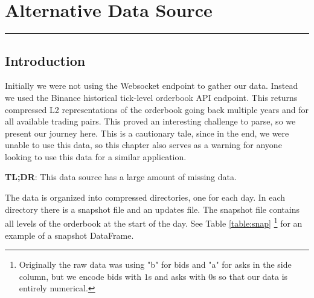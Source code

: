 \chapter{Alternative Data Source}
\hrule
\vspace{40pt}

\section{Introduction}

Initially we were not using the Websocket endpoint to gather our data.
Instead we used the Binance historical tick-level orderbook API endpoint.
This returns compressed L2 representations of the orderbook going back multiple years and
for all available trading pairs.
This proved an interesting challenge to parse, so we present our journey here.
This is a cautionary tale, since in the end, we were unable to use this data, so
this chapter also serves as a warning for anyone looking to use this data for a similar application.

\textbf{TL;DR}: This data source has a large amount of missing data.

The data is organized into compressed directories, one for each day. In each directory
there is a snapshot file and an updates file. The snapshot file contains all levels
of the orderbook at the start of the day. See Table \ref{table:snap} \footnote{Originally the raw data was using "b" for bids and "a" for asks in the side column, but we encode bids with $1$s and asks with $0$s so that our data is entirely numerical.}
for an example of a snapshot DataFrame.

